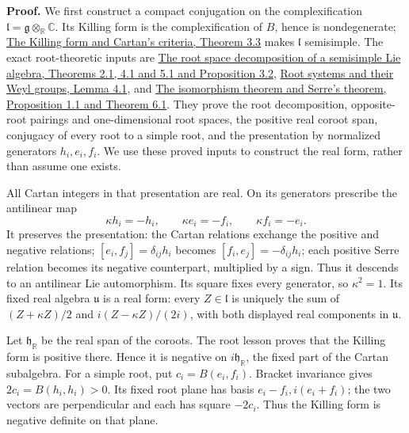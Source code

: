 \documentclass[
  11pt,
]{article}
\begin{document}
\textbf{Proof.} We first construct a compact conjugation on the
complexification
\(\mathfrak l=\mathfrak g\otimes_{\mathbb R}\mathbb C\). Its Killing
form is the complexification of \(B\), hence is nondegenerate;
\href{supporting/RT-LIE/RT-LIE-03.html\#RTLIE03-T33}{The Killing form
and Cartan's criteria, Theorem 3.3} makes \(\mathfrak l\) semisimple.
The exact root-theoretic inputs are
\href{supporting/RT-LIE/RT-LIE-07.html\#RTLIE07-T21}{The root space
decomposition of a semisimple Lie algebra, Theorems 2.1, 4.1 and 5.1 and
Proposition 3.2},
\href{supporting/RT-LIE/RT-LIE-08.html\#RTLIE08-L41}{Root systems and
their Weyl groups, Lemma 4.1}, and
\href{supporting/RT-LIE/RT-LIE-11.html\#RTLIE11-P11}{The isomorphism
theorem and Serre's theorem, Proposition 1.1 and Theorem 6.1}. They
prove the root decomposition, opposite-root pairings and one-dimensional
root spaces, the positive real coroot span, conjugacy of every root to a
simple root, and the presentation by normalized generators
\(h_i,e_i,f_i\). We use these proved inputs to construct the real form,
rather than assume one exists.

All Cartan integers in that presentation are real. On its generators
prescribe the antilinear map \[
\kappa h_i=-h_i,\qquad \kappa e_i=-f_i,\qquad
\kappa f_i=-e_i.
\] It preserves the presentation: the Cartan relations exchange the
positive and negative relations; \([e_i,f_j]=\delta_{ij}h_i\) becomes
\([f_i,e_j]=-\delta_{ij}h_i\); each positive Serre relation becomes its
negative counterpart, multiplied by a sign. Thus it descends to an
antilinear Lie automorphism. Its square fixes every generator, so
\(\kappa^2=1\). Its fixed real algebra \(\mathfrak u\) is a real form:
every \(Z\in\mathfrak l\) is uniquely the sum of \((Z+\kappa Z)/2\) and
\(i(Z-\kappa Z)/(2i)\), with both displayed real components in
\(\mathfrak u\).

Let \(\mathfrak h_{\mathbb R}\) be the real span of the coroots. The
root lesson proves that the Killing form is positive there. Hence it is
negative on \(i\mathfrak h_{\mathbb R}\), the fixed part of the Cartan
subalgebra. For a simple root, put \(c_i=B(e_i,f_i)\). Bracket
invariance gives \(2c_i=B(h_i,h_i)>0\). Its fixed root plane has basis
\(e_i-f_i,i(e_i+f_i)\); the two vectors are perpendicular and each has
square \(-2c_i\). Thus the Killing form is negative definite on that
plane.
\end{document}
